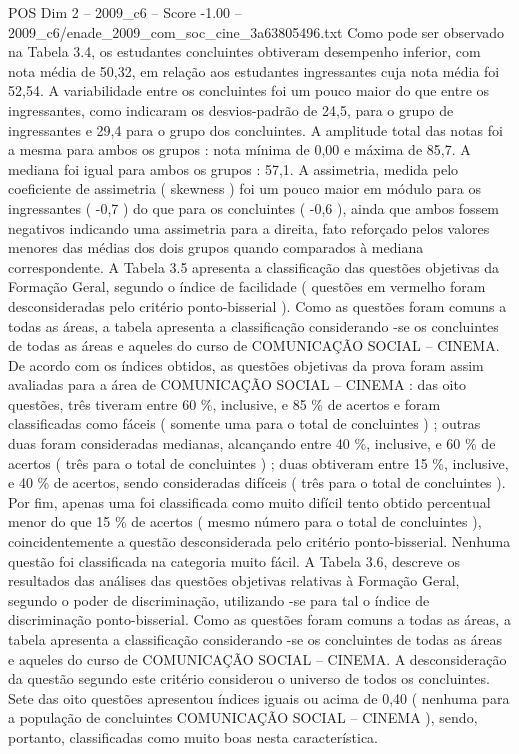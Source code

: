 \begin{textsample}{POS Dim 2 – 2009\_c6 – Score -1.00 – 2009\_c6/enade\_2009\_com\_soc\_cine\_3a63805496.txt}
Como pode ser observado na Tabela 3.4, os estudantes concluintes obtiveram desempenho inferior, com nota média de 50,32, em relação aos estudantes ingressantes cuja nota média foi 52,54.
A variabilidade entre os concluintes foi um pouco maior do que entre os ingressantes, como indicaram os desvios-padrão de 24,5, para o grupo de ingressantes e 29,4 para o grupo dos concluintes.
A amplitude total das notas foi a mesma para ambos os grupos : nota mínima de 0,00 e máxima de 85,7.
A mediana foi igual para ambos os grupos : 57,1.
A assimetria, medida pelo coeficiente de assimetria ( skewness ) foi um pouco maior em módulo para os ingressantes ( -0,7 ) do que para os concluintes ( -0,6 ), ainda que ambos fossem negativos indicando uma assimetria para a direita, fato reforçado pelos valores menores das médias dos dois grupos quando comparados à mediana correspondente.
A Tabela 3.5 apresenta a classificação das questões objetivas da Formação Geral, segundo o índice de facilidade ( questões em vermelho foram desconsideradas pelo critério ponto-bisserial ).
Como as questões foram comuns a todas as áreas, a tabela apresenta a classificação considerando -se os concluintes de todas as áreas e aqueles do curso de COMUNICAÇÃO SOCIAL – CINEMA.
De acordo com os índices obtidos, as questões objetivas da prova foram assim avaliadas para a área de COMUNICAÇÃO SOCIAL – CINEMA : das oito questões, três tiveram entre 60 \%, inclusive, e 85 \% de acertos e foram classificadas como fáceis ( somente uma para o total de concluintes ) ; outras duas foram consideradas medianas, alcançando entre 40 \%, inclusive, e 60 \% de acertos ( três para o total de concluintes ) ; duas obtiveram entre 15 \%, inclusive, e 40 \% de acertos, sendo consideradas difíceis ( três para o total de concluintes ).
Por fim, apenas uma foi classificada como muito difícil tento obtido percentual menor do que 15 \% de acertos ( mesmo número para o total de concluintes ), coincidentemente a questão desconsiderada pelo critério ponto-bisserial.
Nenhuma questão foi classificada na categoria muito fácil.
A Tabela 3.6, descreve os resultados das análises das questões objetivas relativas à Formação Geral, segundo o poder de discriminação, utilizando -se para tal o índice de discriminação ponto-bisserial.
Como as questões foram comuns a todas as áreas, a tabela apresenta a classificação considerando -se os concluintes de todas as áreas e aqueles do curso de COMUNICAÇÃO SOCIAL – CINEMA.
A desconsideração da questão segundo este critério considerou o universo de todos os concluintes.
Sete das oito questões apresentou índices iguais ou acima de 0,40 ( nenhuma para a população de concluintes COMUNICAÇÃO SOCIAL – CINEMA ), sendo, portanto, classificadas como muito boas nesta característica.

\end{textsample}
